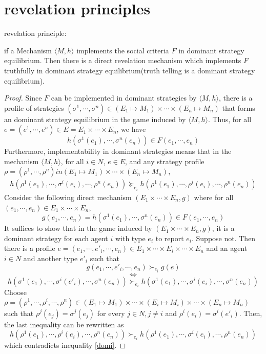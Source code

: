 
\chapter{revelation principles} %

\label{Appendix_A} %

\begin{thm*}
revelation principle:

if a Mechanism $\langle M, h\rangle$ implements the social criteria 
$F$ in dominant strategy
equilibrium. Then there is a direct revelation mechanism which
implements $F$ truthfully in dominant strategy equilibrium(truth
telling is a dominant strategy equilibrium). 

\end{thm*}
\begin{proof}
 Since $F$ can be implemented in dominant strategies by  $\langle M, h\rangle$, there is a profile of strategies $(\sigma^1,\cdots,
 \sigma^n)\in (E_1\mapsto M_1)\times \cdots\times (E_n\mapsto M_n)$
 that forms an dominant strategy  equilibrium in the game induced by $\langle M, h\rangle$. Thus, for
 all $e=(e^1, \cdots,e^n)\in E=E_1\times \cdots\times E_n$, we have
 $$h(\sigma^1(e_1),\cdots,\sigma^n(e_n))\in F(e_1,\cdots,e_n)$$
 Furthermore, implementability in dominant strategies means that  in
 the mechanism $\langle M, h\rangle$, for
 all $i\in N$, $e\in E$, and any  strategy profile
 $\rho=(\rho^1,\cdots,\rho^n) in (E_1\mapsto M_1)\times \cdots\times (E_n\mapsto M_n)$,
 \begin{align}\label{domi}
 h(\rho^1(e_1),\cdots,\sigma^i(e_i),\cdots,\rho^n(e_n)) \succeq_{e_i} h(\rho^1(e_1),\cdots,\rho^i(e_i),\cdots,\rho^n(e_n))
 \end{align}
Consider the following direct mechanism $(E_1\times\cdots\times E_n, g)$ where for all $(e_1,\cdots,e_n)\in E_1\times\cdots\times E_n$,
$$g(e_1,\cdots,e_n)=h(\sigma^1(e_1),\cdots,\sigma^n(e_n))\in F(e_1,\cdots,e_n)$$
It suffices to show that in the game induced by
$(E_1\times\cdots\times E_n, g)$, it is a dominant strategy  for each agent 
$i$ with type $e_i$ to report $e_i$. Suppose not. Then there is a
profile $e=(e_1,\cdots, e'_i, \cdots, e_n)\in E_1\times\cdots \times
E_i \times \cdots \times E_n$ and an
agent $i\in N$ and another type $e'_i$ such that
$$g(e_1, \cdots, e'_i, \cdots, e_n) \succ_{e_i} g(e)$$
$$\Longleftrightarrow$$
$$h(\sigma^1(e_1),\cdots,\sigma^i(e'_i),\cdots,\sigma^n(e_n))\succ_{e_i} h(\sigma^1(e_1),\cdots,\sigma^i(e_i),\cdots,\sigma^n(e_n))$$
Choose  $\rho=(\rho^1,\cdots,\rho^i,\cdots,
 \rho^n)\in (E_1\mapsto M_1)\times \cdots\times (E_i\mapsto M_i)
 \times \cdots\times (E_n\mapsto M_n)$ such that
 $\rho^j(e_j)=\sigma^j(e_j)$ for every $j \in N, j\not = i$ and $\rho^i(e_i)=\sigma^i(e'_i)$. Then, the last inequality can be rewritten as
$$h(\rho^1(e_1),\cdots,\rho^i(e_i),\cdots,\rho^n(e_n))\succ_{e_i}h(\rho^1(e_1),\cdots,\sigma^i(e_i),\cdots,\rho^n(e_n))$$
which contradicts inequality \ref{domi}.
 \end{proof}

